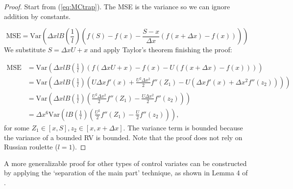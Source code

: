 \documentclass[a4paper,12pt]{article}
\begin{document}
\begin{proof}
  Start from (\ref{eq:MCtrap}). The MSE is the variance
  so we can ignore addition by constants.

  \begin{equation}
    \text{MSE} = \text{Var}\left( \Delta x l B\left( \frac{1}{l}\right)
    \left(f(S) - f(x) - \frac{S - x}{\Delta x}
    \left(f(x+\Delta x) - f(x)\right) \right)\right)
  \end{equation}
  We substitute $S = \Delta x U + x$ and apply Taylor's theorem
  finishing the proof:

  \begin{align}
    \text{MSE} & = \text{Var}\left( \Delta x l B\left( \frac{1}{l}\right)
    \left(f(\Delta x U+x) - f(x) - U
    \left(f(x+\Delta x) - f(x)\right) \right)\right)                           \\
               & = \text{Var}\left( \Delta x l B\left( \frac{1}{l}\right)
    \left( U \Delta x f'(x)+ \frac{U^{2} \Delta x ^{2}}{2} f''(Z_{1})
    - U \left( \Delta x f'(x) +
    \Delta x ^{2} f''(z_{2})\right) \right)\right)                             \\
               & = \text{Var}\left( \Delta x l B\left( \frac{1}{l}\right)
    \left( \frac{U^{2} \Delta x ^{2}}{2} f''(Z_{1})
    -  \frac{U\Delta x ^{2}}{2} f''(z_{2}) \right)\right)                      \\
               & =\Delta x ^{6} \text{Var}\left(  l B\left( \frac{1}{l}\right)
    \left( \frac{U^{2} }{2} f''(Z_{1})
    -  \frac{U}{2} f''(z_{2}) \right)\right),
  \end{align}
  for some $Z_{1} \in [x,S], z_{2} \in [x,x+\Delta x]$. The variance term is bounded
  because the variance of a bounded RV is bounded.
  Note that the proof does not rely on Russian roulette ($l=1$).
\end{proof}

\begin{related}
  A more generalizable proof for other types of control variates can
  be constructed by applying the \enquote*{separation of the main part} technique,
  as shown in Lemma 4 of \cite{heinrich_monte_1993}.
\end{related}
\end{document}
